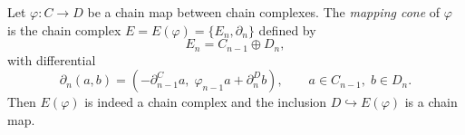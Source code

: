 Let $\varphi: C \rightarrow D$ be a chain map between chain complexes. The \textit{mapping cone} of $\varphi$ is the chain complex $E = E(\varphi) = \{E_n, \partial_n\}$ defined by
$$
E_n = C_{n-1} \oplus D_n,
$$
with differential
$$
\partial_n(a, b) = (-\partial_{n-1}^C a, \;\varphi_{n-1} a + \partial_n^D b), \qquad a \in C_{n-1},\; b \in D_n.
$$
Then $E(\varphi)$ is indeed a chain complex and the inclusion $D \hookrightarrow E(\varphi)$ is a chain map.
